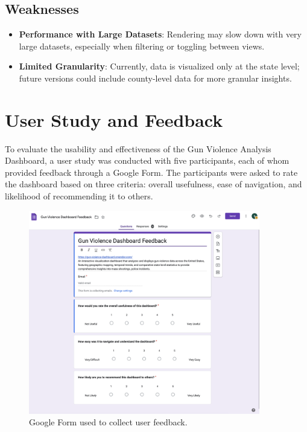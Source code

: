 \documentclass{article}
\begin{document}
\subsection{Weaknesses}
\begin{itemize}
    \item \textbf{Performance with Large Datasets}: Rendering may slow down with very large datasets, especially when filtering or toggling between views.
    \item \textbf{Limited Granularity}: Currently, data is visualized only at the state level; future versions could include county-level data for more granular insights.
\end{itemize}

\section{User Study and Feedback}
To evaluate the usability and effectiveness of the Gun Violence Analysis Dashboard, a user study was conducted with five participants, each of whom provided feedback through a Google Form. The participants were asked to rate the dashboard based on three criteria: overall usefulness, ease of navigation, and likelihood of recommending it to others.

\begin{figure}[H]
    \centering
    \includegraphics[width=0.9\textwidth]{GoogleForm.png}
    \caption{Google Form used to collect user feedback.}
    \label{fig:google_form}
\end{figure}
\end{document}
